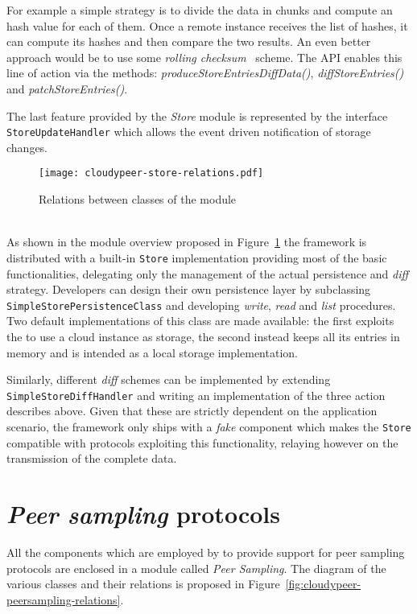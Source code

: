 For example a simple strategy is to divide the data in chunks and
compute an hash value for each of them. Once a remote instance receives
the list of hashes, it can compute its hashes and then
compare the two results. An even better approach would be to use some
\textit{rolling  checksum}~\cite{Rsync} scheme.
The API enables this line of action via the methods:
\textit{produceStoreEntriesDiffData()}, \textit{diffStoreEntries()} and
\textit{patchStoreEntries()}.

The last feature provided by the \textit{Store} module is represented
by the interface \texttt{StoreUpdateHandler} which allows the event
driven notification of storage changes.

\begin{figure}[h!]
  \centering
  \texttt{[image: cloudypeer-store-relations.pdf]}
  \caption{Relations between classes of the \cloudhelper module}
  \label{fig:cloudypeer-store-relations}
\end{figure}

\ \\
As shown in the module overview proposed in
Figure~\ref{fig:cloudypeer-store-relations} the framework is
distributed with a built-in \texttt{Store} implementation providing
most of the basic functionalities, delegating only the management of the
actual persistence and \textit{diff} strategy. Developers can design their
own persistence layer by subclassing
\texttt{Simple\-Store\-Persistence\-Class} and developing \textit{write}, \textit{read} and
\textit{list} procedures. Two default implementations of this class are
made available: the first exploits the \cloudhelper to use a cloud
instance as storage, the second instead keeps all its entries in
memory and is intended as a local storage implementation.

Similarly, different \textit{diff} schemes can be implemented by
extending \texttt{Simple\-Store\-Diff\-Handler} and writing
an implementation of the three action describes above. Given that
these are strictly dependent on the application scenario, the
framework only ships with a \textit{fake} component which makes the
\texttt{Store} compatible with protocols exploiting this
functionality, relaying however on the transmission of the complete data.

\section{\emph{Peer sampling} protocols}
All the components which are employed by \cloudypeer to provide
support for peer sampling protocols are enclosed in a module called
\textit{Peer Sampling}. The diagram of the various classes and their
relations is proposed in Figure~\ref{fig:cloudypeer-peersampling-relations}.


